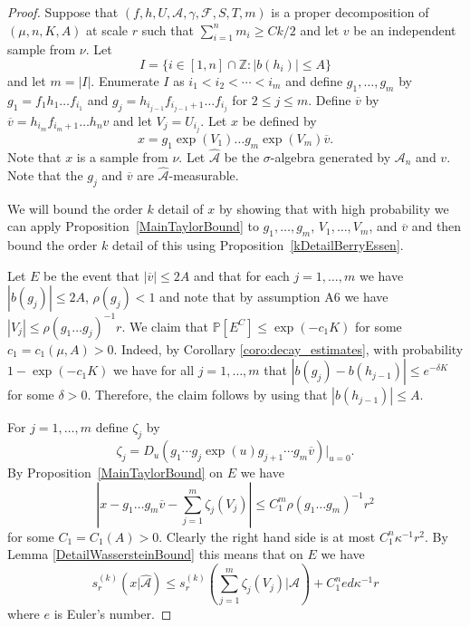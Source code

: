 \documentclass[10pt, english,oneside,reqno]{amsart}
\theoremstyle{plain}
\theoremstyle{remark}
\numberwithin{equation}{section}
\numberwithin{figure}{section}
\newcommand{\Z}{\mathbb{Z}}
\begin{document}
\begin{proof}
    Suppose that $(f, h, U, \mathscr{A}, \gamma, \mathscr{F}, S, T, m)$ is a proper decomposition of $(\mu, n, K, A)$ at scale $r$ such that $\sum_{i=1}^n m_i \geq Ck / 2$ and let $v$ be an independent sample from $\nu$. Let $$I = \{ i \in [1, n] \cap \Z : |b(h_i)| \leq A \}$$ and let $m = |I|$. Enumerate $I$ as $i_1 < i_2 < \cdots < i_m$ and define $g_1, \dots, g_m$ by $g_1 = f_1 h_1 \dots f_{i_1}$ and $g_j = h_{i_{j-1}} f_{i_{j-1}+1} \dots f_{i_j}$ for $2 \leq j \leq m$. Define $\overline{v}$ by $\overline{v} = h_{i_m} f_{i_m +1} \dots h_n v$ and let $V_j = U_{i_j}$. Let $x$ be defined by $$x = g_1 \exp(V_1) \dots g_m \exp(V_m) \overline{v}.$$ Note that $x$ is a sample from $\nu$. Let $\hat{\mathscr{A}}$ be the $\sigma$-algebra generated by $\mathscr{A}_n$ and $v$. Note that the $g_j$ and $\overline{v}$ are $\hat{\mathscr{A}}$-measurable.

    We will bound the order $k$ detail of $x$ by showing that with high probability we can apply Proposition~\ref{MainTaylorBound} to $g_1, \dots, g_m$, $V_1, \dots, V_m$, and $\overline{v}$ and then bound the order $k$ detail of this using Proposition~\ref{kDetailBerryEssen}.

    Let $E$ be the event that $|\overline{v}| \leq 2A$ and that for each $j = 1, \dots, m$ we have $|b(g_j)| \leq 2A$, $\rho(g_j) < 1$ and note that by assumption A6 we have $|V_j| \leq \rho(g_1 \dots g_j)^{-1} r$. We claim that $\mathbb{P}[E^C] \leq \exp(-c_1 K)$ for some $c_1 = c_1(\mu, A) > 0$. Indeed, by Corollary \ref{coro:decay_estimates}, with probability $1 - \exp(-c_1 K)$ we have for all $j = 1, \dots, m$ that $|b(g_j) - b(h_{j-1})| \leq e^{-\delta K}$ for some $\delta > 0$. Therefore, the claim follows by using that $|b(h_{j-1})| \leq A$.
    
    For $j=1, \dots, m$ define $\zeta_j$ by $$\zeta_j = D_u(g_1 \cdots g_j \exp(u) g_{j + 1} \cdots g_m \overline{v})|_{u=0}.$$ By Proposition~\ref{MainTaylorBound} on $E$ we have $$\left|x-g_1 \dots g_m \overline{v} - \sum_{j=1}^m \zeta_j(V_j)\right| \leq C_1^m \rho(g_1 \dots g_m)^{-1} r^2$$ for some $C_1 = C_1(A) > 0$. Clearly the right hand side is at most $C_1^n \kappa^{-1} r^2$. By Lemma \ref{DetailWassersteinBound} this means that on $E$ we have $$s_r^{(k)}(x|\hat{\mathscr{A}}) \leq s_r^{(k)}\left(\sum_{j=1}^m \zeta_j(V_j) | \hat{\mathscr{A}}\right) + C_1^n ed \kappa^{-1} r$$ where $e$ is Euler's number.


\end{proof}
\end{document}
